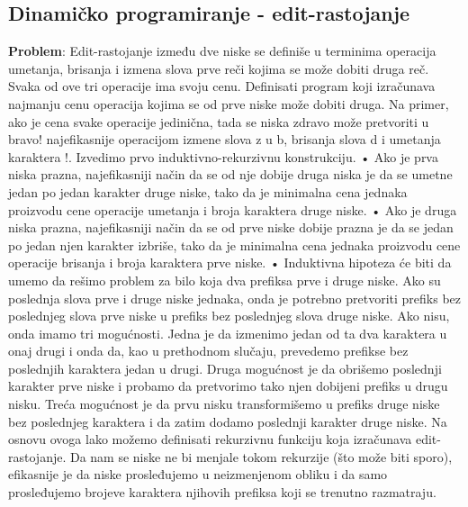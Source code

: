\documentclass{article}
\begin{document}
\subsection{Dinamičko programiranje - edit-rastojanje}
\textbf{Problem}: Edit-rastojanje između dve niske se definiše u terminima operacija
umetanja, brisanja i izmena slova prve reči kojima se može dobiti druga reč.
Svaka od ove tri operacije ima svoju cenu. Definisati program koji izračunava
najmanju cenu operacija kojima se od prve niske može dobiti druga. Na primer,
ako je cena svake operacije jedinična, tada se niska zdravo može pretvoriti u
bravo! najefikasnije operacijom izmene slova z u b, brisanja slova d i umetanja
karaktera !.
\newline
Izvedimo prvo induktivno-rekurzivnu konstrukciju.
\newline \hspace*{0.4cm}• Ako je prva niska prazna, najefikasniji način da se od nje dobije druga niska
je da se umetne jedan po jedan karakter druge niske, tako da je minimalna
cena jednaka proizvodu cene operacije umetanja i broja karaktera druge
niske.
\newline \hspace*{0.4cm}• Ako je druga niska prazna, najefikasniji način da se od prve niske dobije
prazna je da se jedan po jedan njen karakter izbriše, tako da je minimalna
cena jednaka proizvodu cene operacije brisanja i broja karaktera prve
niske.
\newline \hspace*{0.4cm}• Induktivna hipoteza će biti da umemo da rešimo problem za bilo koja
dva prefiksa prve i druge niske. Ako su poslednja slova prve i druge
niske jednaka, onda je potrebno pretvoriti prefiks bez poslednjeg slova
prve niske u prefiks bez poslednjeg slova druge niske. Ako nisu, onda
imamo tri mogućnosti. Jedna je da izmenimo jedan od ta dva karaktera
u onaj drugi i onda da, kao u prethodnom slučaju, prevedemo prefikse
bez poslednjih karaktera jedan u drugi. Druga mogućnost je da obrišemo
poslednji karakter prve niske i probamo da pretvorimo tako njen dobijeni
prefiks u drugu nisku. Treća mogućnost je da prvu nisku transformišemo u
prefiks druge niske bez poslednjeg karaktera i da zatim dodamo poslednji
karakter druge niske.
\newline
Na osnovu ovoga lako možemo definisati rekurzivnu funkciju koja izračunava
edit-rastojanje. Da nam se niske ne bi menjale tokom rekurzije (što može biti
sporo), efikasnije je da niske prosleđujemo u neizmenjenom obliku i da samo
prosleđujemo brojeve karaktera njihovih prefiksa koji se trenutno razmatraju.
\end{document}
